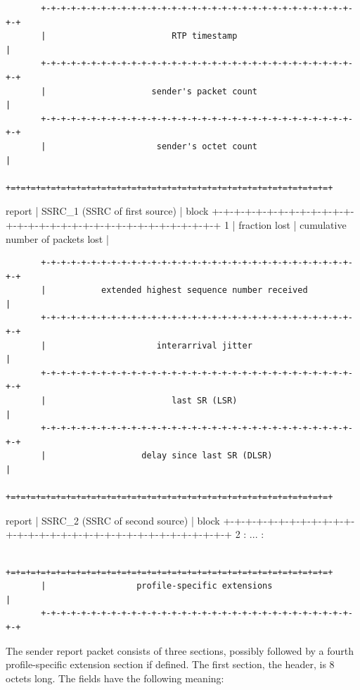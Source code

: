 \documentclass{article}
\begin{document}
\begin{verbatim}
       +-+-+-+-+-+-+-+-+-+-+-+-+-+-+-+-+-+-+-+-+-+-+-+-+-+-+-+-+-+-+-+-+
       |                         RTP timestamp                         |
       +-+-+-+-+-+-+-+-+-+-+-+-+-+-+-+-+-+-+-+-+-+-+-+-+-+-+-+-+-+-+-+-+
       |                     sender's packet count                     |
       +-+-+-+-+-+-+-+-+-+-+-+-+-+-+-+-+-+-+-+-+-+-+-+-+-+-+-+-+-+-+-+-+
       |                      sender's octet count                     |
       +=+=+=+=+=+=+=+=+=+=+=+=+=+=+=+=+=+=+=+=+=+=+=+=+=+=+=+=+=+=+=+=+
\end{verbatim}

report |                 SSRC\_1 (SSRC of first source)                 | block  +-+-+-+-+-+-+-+-+-+-+-+-+-+-+-+-+-+-+-+-+-+-+-+-+-+-+-+-+-+-+-+-+ 1    | fraction lost |       cumulative number of packets lost       |

\begin{verbatim}
       +-+-+-+-+-+-+-+-+-+-+-+-+-+-+-+-+-+-+-+-+-+-+-+-+-+-+-+-+-+-+-+-+
       |           extended highest sequence number received           |
       +-+-+-+-+-+-+-+-+-+-+-+-+-+-+-+-+-+-+-+-+-+-+-+-+-+-+-+-+-+-+-+-+
       |                      interarrival jitter                      |
       +-+-+-+-+-+-+-+-+-+-+-+-+-+-+-+-+-+-+-+-+-+-+-+-+-+-+-+-+-+-+-+-+
       |                         last SR (LSR)                         |
       +-+-+-+-+-+-+-+-+-+-+-+-+-+-+-+-+-+-+-+-+-+-+-+-+-+-+-+-+-+-+-+-+
       |                   delay since last SR (DLSR)                  |
       +=+=+=+=+=+=+=+=+=+=+=+=+=+=+=+=+=+=+=+=+=+=+=+=+=+=+=+=+=+=+=+=+
\end{verbatim}

report |                 SSRC\_2 (SSRC of second source)                | block  +-+-+-+-+-+-+-+-+-+-+-+-+-+-+-+-+-+-+-+-+-+-+-+-+-+-+-+-+-+-+-+-+ 2    :                               ...                             :

\begin{verbatim}
       +=+=+=+=+=+=+=+=+=+=+=+=+=+=+=+=+=+=+=+=+=+=+=+=+=+=+=+=+=+=+=+=+
       |                  profile-specific extensions                  |
       +-+-+-+-+-+-+-+-+-+-+-+-+-+-+-+-+-+-+-+-+-+-+-+-+-+-+-+-+-+-+-+-+
\end{verbatim}

The sender report packet consists of three sections, possibly followed by a fourth profile-specific extension section if defined. The first section, the header, is 8 octets long.  The fields have the following meaning:
\end{document}
